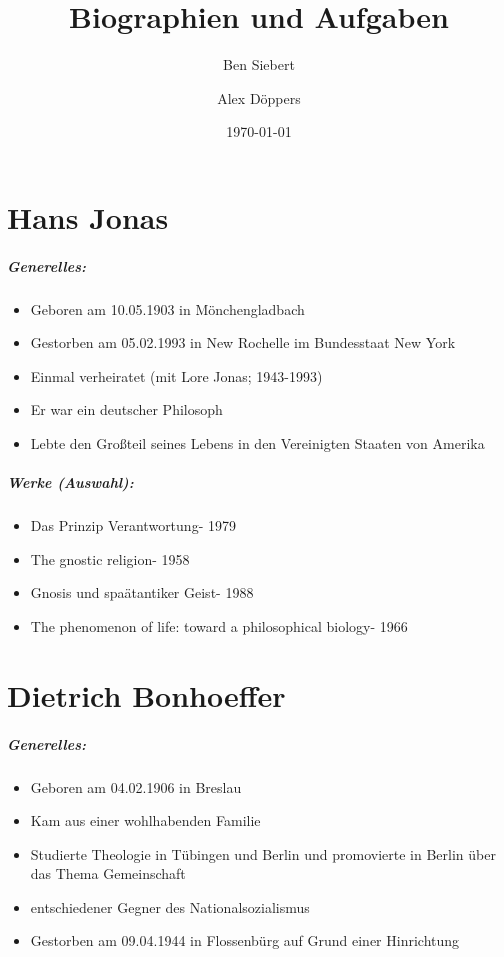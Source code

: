 \documentclass[11pt, a4paper]{report}
\begin{document}
	\bsremovechaptertitle
	\title{Biographien und Aufgaben}
	\date{\today}
	\author{Ben Siebert \and Alex D\"oppers}
	\maketitle
	\tableofcontents
	\chapter{Hans Jonas}
	\paragraph{Generelles:}
	\begin{itemize}
		\item Geboren am 10.05.1903 in M\"onchengladbach
		\item Gestorben am 05.02.1993 in New Rochelle im Bundesstaat New York
		\item Einmal verheiratet (mit Lore Jonas; 1943-1993)
		\item Er war ein deutscher Philosoph
		\item Lebte den Großteil seines Lebens in den Vereinigten Staaten von Amerika
	\end{itemize}
	\paragraph{Werke (Auswahl):}
	\begin{itemize}
		\item \dq Das Prinzip Verantwortung\dq - 1979
		\item \dq The gnostic religion\dq - 1958
		\item \dq Gnosis und spa\"atantiker Geist\dq - 1988
		\item \dq The phenomenon of life: toward a philosophical biology\dq - 1966
	\end{itemize}
	\chapter{Dietrich Bonhoeffer}
	\paragraph{Generelles:}
	\begin{itemize}
		\item Geboren am 04.02.1906 in Breslau
		\item Kam aus einer wohlhabenden Familie
		\item Studierte Theologie in T\"ubingen und Berlin und promovierte in Berlin \"uber das Thema Gemeinschaft
		\item entschiedener Gegner des Nationalsozialismus
		\item Gestorben am 09.04.1944 in Flossenb\"urg auf Grund einer Hinrichtung
	\end{itemize}
\end{document}
